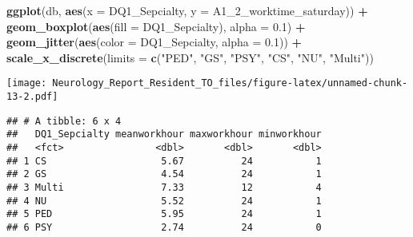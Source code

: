 \documentclass[]{book}
\newenvironment{Shaded}{\begin{snugshade}}{\end{snugshade}}
\newcommand{\DataTypeTok}[1]{\textcolor[rgb]{0.13,0.29,0.53}{#1}}
\newcommand{\DecValTok}[1]{\textcolor[rgb]{0.00,0.00,0.81}{#1}}
\newcommand{\FloatTok}[1]{\textcolor[rgb]{0.00,0.00,0.81}{#1}}
\newcommand{\KeywordTok}[1]{\textcolor[rgb]{0.13,0.29,0.53}{\textbf{#1}}}
\newcommand{\NormalTok}[1]{#1}
\newcommand{\OperatorTok}[1]{\textcolor[rgb]{0.81,0.36,0.00}{\textbf{#1}}}
\newcommand{\StringTok}[1]{\textcolor[rgb]{0.31,0.60,0.02}{#1}}
\begin{document}
\begin{Shaded}
\begin{Highlighting}[]
\KeywordTok{ggplot}\NormalTok{(db, }\KeywordTok{aes}\NormalTok{(}\DataTypeTok{x =}\NormalTok{ DQ1_Sepcialty, }\DataTypeTok{y =}\NormalTok{ A1_}\DecValTok{2}\NormalTok{_worktime_saturday)) }\OperatorTok{+}
\StringTok{  }\KeywordTok{geom_boxplot}\NormalTok{(}\KeywordTok{aes}\NormalTok{(}\DataTypeTok{fill =}\NormalTok{ DQ1_Sepcialty), }\DataTypeTok{alpha =} \FloatTok{0.1}\NormalTok{) }\OperatorTok{+}\StringTok{ }
\StringTok{  }\KeywordTok{geom_jitter}\NormalTok{(}\KeywordTok{aes}\NormalTok{(}\DataTypeTok{color =}\NormalTok{ DQ1_Sepcialty, }\DataTypeTok{alpha =} \FloatTok{0.1}\NormalTok{)) }\OperatorTok{+}
\StringTok{  }\KeywordTok{scale_x_discrete}\NormalTok{(}\DataTypeTok{limits =} \KeywordTok{c}\NormalTok{(}\StringTok{"PED"}\NormalTok{, }\StringTok{"GS"}\NormalTok{, }\StringTok{"PSY"}\NormalTok{, }\StringTok{"CS"}\NormalTok{, }\StringTok{"NU"}\NormalTok{, }\StringTok{"Multi"}\NormalTok{))}
\end{Highlighting}
\end{Shaded}

\texttt{[image: Neurology\_Report\_Resident\_TO\_files/figure-latex/unnamed-chunk-13-2.pdf]}

\begin{Shaded}
\end{Shaded}

\begin{verbatim}
## # A tibble: 6 x 4
##   DQ1_Sepcialty meanworkhour maxworkhour minworkhour
##   <fct>                <dbl>       <dbl>       <dbl>
## 1 CS                    5.67          24           1
## 2 GS                    4.54          24           1
## 3 Multi                 7.33          12           4
## 4 NU                    5.52          24           1
## 5 PED                   5.95          24           1
## 6 PSY                   2.74          24           0
\end{verbatim}
\end{document}
